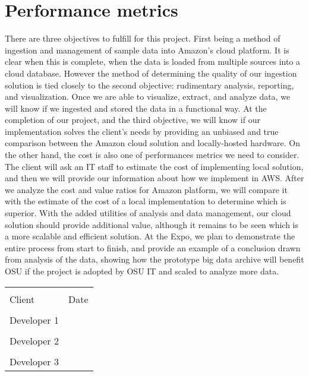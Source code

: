 \documentclass[letterpaper,10pt]{article}
\begin{document}
	\section{Performance metrics}
	There are three objectives to fulfill for this project. First being a method of ingestion and management of sample data into Amazon’s cloud platform. It is clear when this is complete, when the data is loaded from multiple sources into a cloud database. However the method of determining the quality of our ingestion solution is tied closely to the second objective: rudimentary analysis, reporting, and visualization. Once we are able to visualize, extract, and analyze data, we will know if we ingested and stored the data in a functional way. At the completion of our project, and the third objective, we will know if our implementation solves the client’s needs by providing an unbiased and true comparison between the Amazon cloud solution and locally-hosted hardware. On the other hand, the cost is also one of performances metrics we need to consider. The client will ask an IT staff to estimate the cost of implementing local solution, and then we will provide our information about how we implement in AWS. After we analyze the cost and value ratios for Amazon platform, we will compare it with the estimate of the cost of a local implementation to determine which is superior. With the added utilities of analysis and data management, our cloud solution should provide additional value, although it remains to be seen which is a more scalable and efficient solution. At the Expo, we plan to demonstrate the entire process from start to finish, and provide an example of a conclusion drawn from analysis of the data, showing how the prototype big data archive will benefit OSU if the project is adopted by OSU IT and scaled to analyze more data.

	\newpage
	\noindent\begin{tabular}{ll}
	\makebox[2.5in]{\hrulefill} & \makebox[2.5in]{\hrulefill}\\
	Client & Date\\[8ex]%
	\makebox[2.5in]{\hrulefill}\\
	Developer 1\\[8ex]
	\makebox[2.5in]{\hrulefill}\\
	Developer 2\\[8ex]
	\makebox[2.5in]{\hrulefill}\\
	Developer 3\\[8ex]
	\end{tabular}
\end{document}
